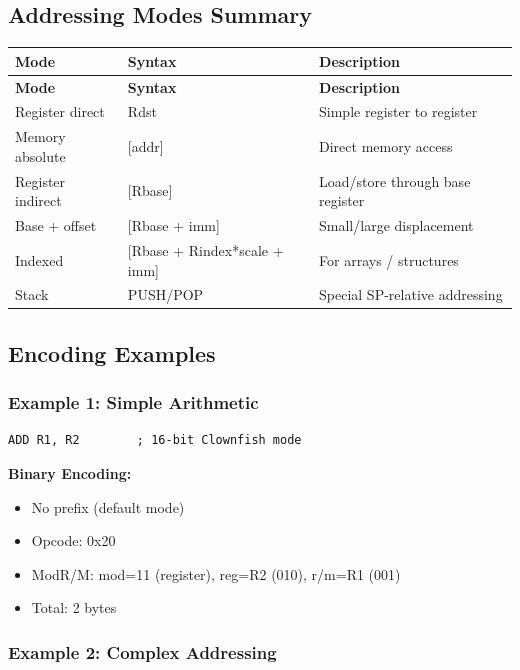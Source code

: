 \documentclass[12pt]{article}
\begin{document}
\subsection{Addressing Modes Summary}

\begin{longtable}{@{}lll@{}}
\toprule
\textbf{Mode} & \textbf{Syntax} & \textbf{Description} \\ \midrule
\endfirsthead
\toprule
\textbf{Mode} & \textbf{Syntax} & \textbf{Description} \\ \midrule
\endhead
Register direct & Rdst & Simple register to register \\
Memory absolute & [addr] & Direct memory access \\
Register indirect & [Rbase] & Load/store through base register \\
Base + offset & [Rbase + imm] & Small/large displacement \\
Indexed & [Rbase + Rindex*scale + imm] & For arrays / structures \\
Stack & PUSH/POP & Special SP-relative addressing \\ \bottomrule
\end{longtable}

\subsection{Encoding Examples}

\subsubsection{Example 1: Simple Arithmetic}

\begin{lstlisting}
ADD R1, R2        ; 16-bit Clownfish mode
\end{lstlisting}

\textbf{Binary Encoding:}
\begin{itemize}
    \item No prefix (default mode)
    \item Opcode: 0x20
    \item ModR/M: mod=11 (register), reg=R2 (010), r/m=R1 (001)
    \item Total: 2 bytes
\end{itemize}

\subsubsection{Example 2: Complex Addressing}
\end{document}
